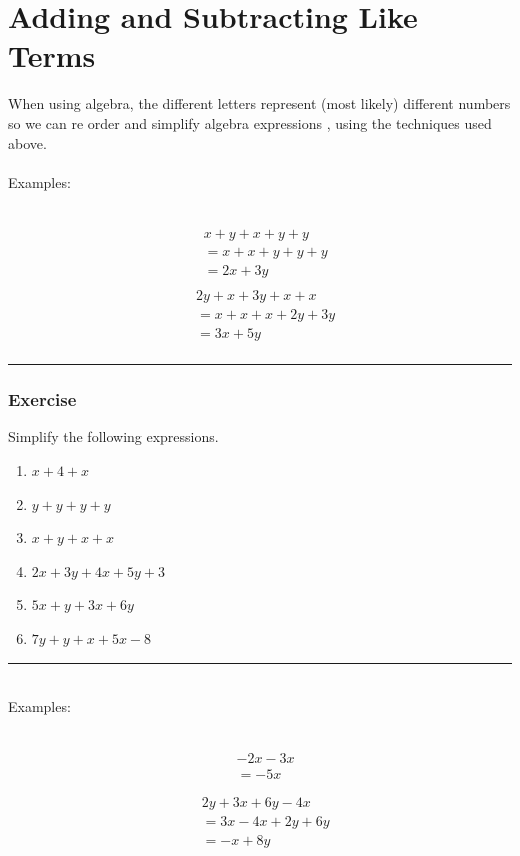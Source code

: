 \documentclass[a4paper,12pt]{article}
\newcommand\question{
	 \rule[0pt]{17cm}{0.5pt}\vspace{-0.5cm}
	\subsubsection{Exercise}

}
\newcommand\questionend{
	\rule[0pt]{17cm}{0.5pt}\vspace{0.0cm}\\
}
\begin{document}
\section{Adding and Subtracting Like Terms}
When using algebra, the different letters represent (most likely) different numbers so we can re order and simplify algebra expressions , using the techniques used above.\\\\
Examples:
\begin{multicols}{2}
	~\vspace{-1.1cm}
	\begin{align*}
		& x+ y +x + y+ y\\
		&=  x + x + y + y+y\\
		&= 2x + 3y\\
	\end{align*}
	\begin{align*}
		& 2y +x + 3y + x+ x\\
		&=  x + x+x+ 2y+3y\\
		&= 3x + 5y\\
	\end{align*}
\end{multicols}
\question
Simplify the following expressions.
\begin{multicols}{2}
	\begin{enumerate}[label=\normalsize \alph*)~~~ , topsep=8pt,itemsep=5pt,partopsep=4pt, parsep=4pt]
		\item $x+4+x$
		\item $y+y+y+y$
		\item $x+y+x+x$
		\item $2x+3y+4x +5y +3$
		\item $5x+y + 3x+6y$
		\item $7y +y +x+5x -8$
	\end{enumerate}
\end{multicols}\vspace{0.2cm}
\questionend
Examples:
\begin{multicols}{2}
	~\vspace{-1cm}
	\begin{align*}
		& -2x - 3x\\
		&= -5x\\\\
	\end{align*}
	\begin{align*}
		& 2y+3x +6y -4x\\
		&=  3x - 4x + 2y +6y\\
		&= -x + 8y\\
	\end{align*}
\end{multicols}
\end{document}
